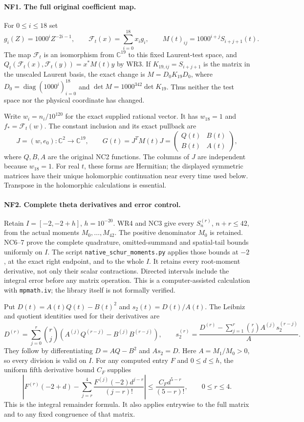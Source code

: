 \documentclass[11pt,a4paper]{article}
\theoremstyle{definition}\newtheorem{definition}[theorem]{Definition}
\newcommand{\B}{\mathbb B}\newcommand{\N}{\mathbb N}
\begin{document}
\paragraph{NF1. The full original coefficient map.}
For $0\le i\le18$ set
\[
 g_i(Z)=1000^iZ^{-2i-1},\qquad
 \mathcal F_t(x)=\sum_{i=0}^{18}x_i g_i,
 \qquad M(t)_{ij}=1000^{i+j}S_{i+j+1}(t).
 \tag{NF1}
\]
The map $\mathcal F_t$ is an isomorphism from $\mathbb C^{19}$ to
this fixed Laurent-test space, and
$Q_t(\mathcal F_t(x),\mathcal F_t(y))=x^*M(t)y$ by WR3.
If $K_{19,ij}=S_{i+j+1}$ is the matrix in the unscaled Laurent
basis, the exact change is $M=D_0K_{19}D_0$, where
$D_0=\operatorname{diag}(1000^i)_{i=0}^{18}$ and
$\det M=1000^{342}\det K_{19}$. Thus neither the test space nor
the physical coordinate has changed.

Write $w_i=n_i/10^{120}$ for the exact supplied rational vector.
It has $w_{18}=1$ and $f_* =\mathcal F_t(w)$. The constant
inclusion and its exact pullback are
\[
 J=(w,e_0):\mathbb C^2\longrightarrow\mathbb C^{19},\qquad
 G(t)=J^TM(t)J=
 \begin{pmatrix}Q(t)&B(t)\\B(t)&A(t)\end{pmatrix},
 \tag{NF2}
\]
where $Q,B,A$ are the original NC2 functions. The columns of $J$
are independent because $w_{18}=1$. For real $t$, these forms are
Hermitian; the displayed symmetric matrices have their unique
holomorphic continuation near every time used below. Transpose in
the holomorphic calculations is essential.

\paragraph{NF2. Complete theta derivatives and error control.}
Retain $I=[-2,-2+h]$, $h=10^{-20}$. WR4 and NC3 give every
$S_n^{(r)}$, $n+r\le42$, from the actual moments $M_0,\ldots,M_{42}$.
The positive denominator $M_0$ is retained. NC6--7 prove the complete
quadrature, omitted-summand and spatial-tail bounds uniformly on
$I$. The script \texttt{native\_schur\_moments.py} applies those
bounds at $-2$, at the exact right endpoint, and to the whole $I$.
It retains every root-moment derivative, not only their scalar
contractions. Directed intervals include the integral error before
any matrix operation. This is a computer-assisted calculation with
\texttt{mpmath.iv}; the library itself is not formally verified.

Put $D(t)=A(t)Q(t)-B(t)^2$ and $s_2(t)=D(t)/A(t)$.
The Leibniz and quotient identities used for their derivatives are
\[
 D^{(r)}=\sum_{j=0}^r\binom rj
 (A^{(j)}Q^{(r-j)}-B^{(j)}B^{(r-j)}),\qquad
 s_2^{(r)}=\frac{D^{(r)}-\sum_{j=1}^r\binom rj A^{(j)}s_2^{(r-j)}}{A}.
 \tag{NF3}
\]
They follow by differentiating $D=AQ-B^2$ and $As_2=D$.
Here $A=M_1/M_0>0$, so every division is valid on $I$.
For any computed entry $F$ and $0\le d\le h$, the uniform fifth
derivative bound $C_F$ supplies
\[
 \left|F^{(r)}(-2+d)-
 \sum_{j=r}^4\frac{F^{(j)}(-2)d^{j-r}}{(j-r)!}\right|
 \le \frac{C_Fd^{5-r}}{(5-r)!},\qquad 0\le r\le4.
 \tag{NF4}
\]
This is the integral remainder formula. It also applies entrywise
to the full matrix and to any fixed congruence of that matrix.
\end{document}
